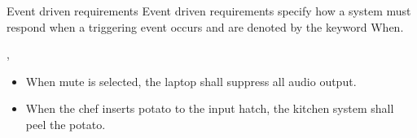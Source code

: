 \documentclass[aspectratio=169]{beamer}
\begin{document}


\begin{slide}{Event driven requirements}
  Event driven requirements specify how a system must respond when a triggering event occurs and are denoted by the keyword When.
    \begin{block}{}\centering
      \ewhen[<trigger>], 
    \end{block}
  
  \begin{example}
  \begin{itemize}
    \item When mute is selected, the laptop shall suppress all audio output.
    \item When the chef inserts potato to the input hatch, the kitchen system shall peel the potato.
  \end{itemize}
  \end{example}
\end{slide}


\end{document}
